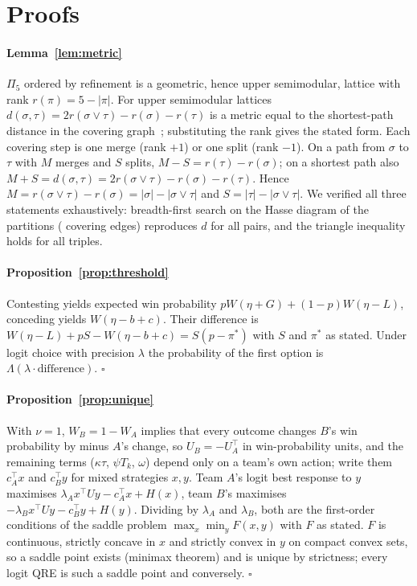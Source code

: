 
\section{Proofs}
\label{app:proofs}

\paragraph*{Lemma~\ref{lem:metric}}
$\Pi_5$ ordered by refinement is a geometric, hence upper semimodular, lattice with rank $r(\pi)=5-|\pi|$.
For upper semimodular lattices $d(\sigma,\tau)=2r(\sigma\vee\tau)-r(\sigma)-r(\tau)$ is a metric equal to the shortest-path distance in the covering graph~\cite{monjardet1981metrics}; substituting the rank gives the stated form.
Each covering step is one merge (rank $+1$) or one split (rank $-1$). On a path from $\sigma$ to $\tau$ with $M$ merges and $S$ splits, $M-S=r(\tau)-r(\sigma)$; on a shortest path also $M+S=d(\sigma,\tau)=2r(\sigma\vee\tau)-r(\sigma)-r(\tau)$. Hence $M=r(\sigma\vee\tau)-r(\sigma)=|\sigma|-|\sigma\vee\tau|$ and $S=|\tau|-|\sigma\vee\tau|$.
We verified all three statements exhaustively: breadth-first search on the Hasse diagram of the  partitions ( covering edges) reproduces $d$ for all pairs, and the triangle inequality holds for all triples.

\paragraph*{Proposition~\ref{prop:threshold}}
Contesting yields expected win probability $pW(\eta+G)+(1-p)W(\eta-L)$, conceding yields $W(\eta-b+c)$.
Their difference is $W(\eta-L)+pS-W(\eta-b+c)=S(p-\pi^*)$ with $S$ and $\pi^*$ as stated.
Under logit choice with precision $\lambda$ the probability of the first option is $\Lambda(\lambda\cdot\text{difference})$. \hfill$\square$

\paragraph*{Proposition~\ref{prop:unique}}
With $\nu=1$, $W_B=1-W_A$ implies that every outcome changes $B$'s win probability by minus $A$'s change, so $U_B=-U_A^\top$ in win-probability units, and the remaining terms ($\kappa\tau$, $\psi T_k$, $\omega$) depend only on a team's own action; write them $c_A^\top x$ and $c_B^\top y$ for mixed strategies $x,y$.
Team $A$'s logit best response to $y$ maximises $\lambda_A x^\top Uy-c_A^\top x+H(x)$, team $B$'s maximises $-\lambda_B x^\top Uy-c_B^\top y+H(y)$.
Dividing by $\lambda_A$ and $\lambda_B$, both are the first-order conditions of the saddle problem $\max_x\min_y F(x,y)$ with $F$ as stated.
$F$ is continuous, strictly concave in $x$ and strictly convex in $y$ on compact convex sets, so a saddle point exists (minimax theorem) and is unique by strictness; every logit QRE is such a saddle point and conversely. \hfill$\square$

